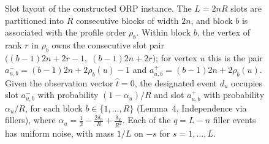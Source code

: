 \documentclass[11pt]{article}
\begin{document}
\begin{figure}[ht]

\caption{Slot layout of the constructed ORP instance.  The $L=2nR$ slots are
partitioned into $R$ consecutive blocks of width $2n$, and block $b$ is
associated with the profile order $\rho_b$.  Within block $b$, the vertex of
rank $r$ in $\rho_b$ owns the consecutive slot pair
$\bigl((b{-}1)2n+2r-1,\;(b{-}1)2n+2r\bigr)$; for vertex $u$ this is the pair
$a^-_{u,b}=(b{-}1)2n+2\rho_b(u)-1$ and $a^+_{u,b}=(b{-}1)2n+2\rho_b(u)$.
Given the observation vector $\hat t=0$, the designated event $d_u$ occupies
slot $a^-_{u,b}$ with probability $(1-\alpha_u)/R$ and slot $a^+_{u,b}$ with
probability $\alpha_u/R$, for each block $b\in\{1,\ldots,R\}$ (Lemma~4,
Independence via fillers), where
$\alpha_u=\tfrac12-\tfrac{2\delta_u}{R}+\tfrac{\delta_u}{R^2}$.  Each of the
$q=L-n$ filler events has uniform noise, with mass $1/L$ on $-s$ for
$s=1,\ldots,L$.}
\end{figure}
\end{document}

